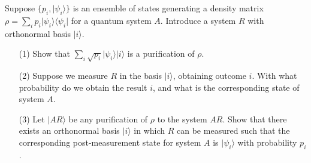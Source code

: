 \documentclass[en]{sol-man}
\begin{document}
\begin{exe}
    Suppose $\{p_i,\lvert\psi_i\rangle\}$ is an ensemble of states generating a density matrix $\rho=\sum_ip_i\lvert\psi_i\rangle\langle\psi_i\rvert$ for a quantum system $A$. Introduce a system $R$ with orthonormal basis $\lvert i\rangle$.
    \begin{itemize}
        \item[(1)] Show that $\sum_i\sqrt{p_i}\lvert\psi_i\rangle\lvert i\rangle$ is a purification of $\rho$.
        \item[(2)] Suppose we measure $R$ in the basis $\lvert i\rangle$, obtaining outcome $i$. With what probability do we obtain the result $i$, and what is the corresponding state of system $A$.
        \item[(3)] Let $\lvert AR\rangle$ be any purification of $\rho$ to the system $AR$. Show that there exists an orthonormal basis $\lvert i\rangle$ in which $R$ can be measured such that the corresponding post-measurement state for system $A$ is $\lvert\psi_i\rangle$ with probability $p_i$.
    \end{itemize}
\end{exe}
\end{document}
